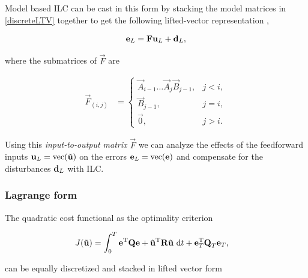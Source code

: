 \noindent Model based ILC can be cast in this form by stacking the model matrices in \eqref{discreteLTV} together to get the following lifted-vector representation \cite{Bristow06}, \cite{Schoellig12}

\begin{equation}
\begin{aligned}
\boldsymbol{\mathrm{e}}_L &= \boldsymbol{\mathrm{F}}\boldsymbol{\mathrm{u}}_L + \boldsymbol{\mathrm{d}}_L, \\
\end{aligned}
\label{liftedLTV}
\end{equation}

\noindent where the submatrices of $\vec{F}$ are

\begin{equation}
\begin{aligned}
\vec{F}_{(i,j)} &= \left \{
\begin{array}{cc}
\vec{A}_{i-1}\ldots \vec{A}_j \vec{B}_{j-1}, & j < i, \\ 
\vec{B}_{j-1}, & j = i, \\
\vec{0}, & j > i. 
\end{array} \right.
\end{aligned}
\label{Fmatrix}
\end{equation}

\noindent Using this \emph{input-to-output matrix} $\vec{F}$ we can analyze the effects of the feedforward inputs $\boldsymbol{\mathrm{u}}_L = \operatorname{vec}(\tilde{\boldsymbol{\mathrm{u}}})$ on the errors $\boldsymbol{\mathrm{e}}_L = \operatorname{vec}(\boldsymbol{\mathrm{e}})$ and compensate for the disturbances $\boldsymbol{\mathrm{d}}_L$ with ILC.


\subsubsection{Lagrange form} The quadratic cost functional as the optimality criterion

\begin{equation}
\begin{aligned}
J(\tilde{\boldsymbol{\mathrm{u}}}) &= \int_{0}^{T} \boldsymbol{\mathrm{e}}^{\mathrm{T}}\boldsymbol{\mathrm{Q}}\boldsymbol{\mathrm{e}} + \tilde{\boldsymbol{\mathrm{u}}}^{\mathrm{T}}\boldsymbol{\mathrm{R}}\tilde{\boldsymbol{\mathrm{u}}} \ \mathrm{d}t + \boldsymbol{\mathrm{e}}_{T}^{\mathrm{T}}\boldsymbol{\mathrm{Q}}_{T}\boldsymbol{\mathrm{e}}_{T},
\end{aligned}
\label{cost}
\end{equation}

\noindent can be equally discretized and stacked in lifted vector form

